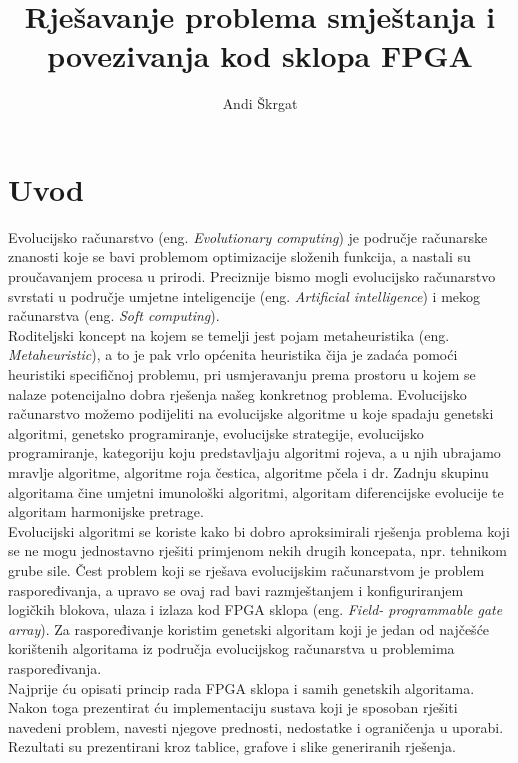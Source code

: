 \documentclass[times, utf8, zavrsni]{fer}
\begin{document}

\title{Rješavanje problema smještanja i povezivanja kod sklopa FPGA}

\author{Andi Škrgat}

\maketitle

\izvornik

\zahvala{}

\tableofcontents

\chapter{Uvod}

Evolucijsko računarstvo (eng. \emph{Evolutionary computing}) je područje računarske znanosti koje se bavi problemom optimizacije složenih funkcija, a nastali su proučavanjem procesa u prirodi. Preciznije bismo mogli evolucijsko računarstvo svrstati u područje umjetne inteligencije (eng. \emph{Artificial intelligence}) i mekog računarstva (eng. \emph{Soft computing}).\\Roditeljski koncept na kojem se temelji jest pojam metaheuristika (eng. \emph{Metaheuristic}), a to je pak vrlo općenita heuristika čija je zadaća pomoći heuristiki specifičnoj problemu, pri usmjeravanju prema prostoru u kojem se nalaze potencijalno dobra rješenja našeg konkretnog problema. Evolucijsko računarstvo možemo podijeliti na evolucijske algoritme u koje spadaju genetski algoritmi, genetsko programiranje, evolucijske strategije, evolucijsko programiranje, kategoriju koju predstavljaju algoritmi rojeva, a u njih ubrajamo mravlje algoritme, algoritme roja čestica, algoritme pčela i dr. Zadnju skupinu algoritama čine umjetni imunološki algoritmi, algoritam diferencijske evolucije te algoritam harmonijske pretrage.\\
Evolucijski algoritmi se koriste kako bi dobro aproksimirali rješenja problema koji se ne mogu jednostavno rješiti primjenom nekih drugih koncepata, npr. tehnikom grube sile. Čest problem koji se rješava evolucijskim računarstvom je problem raspoređivanja, a upravo se ovaj rad bavi razmještanjem i konfiguriranjem logičkih blokova, ulaza i izlaza kod FPGA sklopa (eng. \emph{Field- programmable gate array}). Za raspoređivanje koristim genetski algoritam koji je jedan od najčešće korištenih algoritama iz područja evolucijskog računarstva u problemima raspoređivanja.\\
Najprije ću opisati princip rada FPGA sklopa i samih genetskih algoritama. Nakon toga prezentirat ću implementaciju sustava koji je sposoban rješiti navedeni problem, navesti njegove prednosti, nedostatke i ograničenja u uporabi. Rezultati su prezentirani kroz tablice, grafove i slike generiranih rješenja. 
\end{document}
